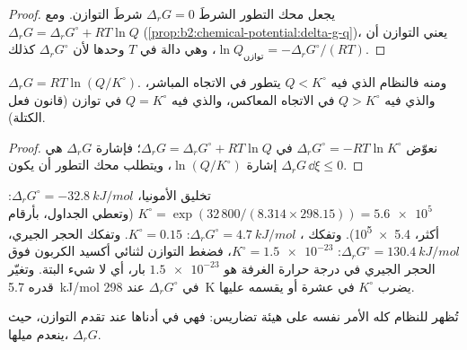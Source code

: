 \begin{proof}
يجعل محك التطور الشرطَ $\Delta_r G = 0$ شرطَ التوازن.
ومع $\Delta_r G = \Delta_r G^\circ + RT\ln Q$
(\cref{prop:b2:chemical-potential:delta-g-q})، يعني التوازن أن $\ln Q_{\text{توازن}}
= -\Delta_r G^\circ/(RT)$، وهي دالة في $T$ وحدها لأن $\Delta_r G^\circ$ كذلك.
\end{proof}

\begin{corollary}\label{cor:b2:equilibrium-shifts:mass-action}
$\Delta_r G = RT\ln(Q/K^\circ)$. ومنه فالنظام الذي فيه $Q < K^\circ$ يتطور
في الاتجاه المباشر، والذي فيه $Q > K^\circ$ في الاتجاه المعاكس، والذي فيه $Q = K^\circ$ في
توازن (قانون فعل الكتلة).
\end{corollary}

\begin{proof}
نعوّض $\Delta_r G^\circ = -RT\ln K^\circ$ في $\Delta_r G = \Delta_r G^\circ
+ RT\ln Q$؛ فإشارة $\Delta_r G$ هي إشارة $\ln(Q/K^\circ)$، ويتطلب
محك التطور أن يكون $\Delta_r G\,\dd\xi \leq 0$.
\end{proof}

\begin{example}\label{ex:b2:equilibrium-shifts:constants}
تخليق الأمونيا، $\Delta_r G^\circ = \qty{-32.8}{kJ/mol}$: $K^\circ =
\exp(32\,800/(8.314 \times 298.15)) = \num{5.6e5}$ (وتعطي الجداول، بأرقام
أكثر، \num{5.4e5}). وتفكك ، $\Delta_r G^\circ =
\qty{+4.7}{kJ/mol}$: $K^\circ = 0.15$. وتفكك الحجر الجيري،
$\Delta_r G^\circ = \qty{+130.4}{kJ/mol}$: $K^\circ = \num{1.5e-23}$، فضغط
التوازن لثنائي أكسيد الكربون فوق الحجر الجيري في درجة حرارة الغرفة
هو $\num{1.5e-23}$ بار، أي لا شيء البتة. وتغيّر قدره \qty{5.7}{kJ/mol} في
$\Delta_r G^\circ$ عند \qty{298}{K} يضرب $K^\circ$ في عشرة أو يقسمه عليها.
\end{example}

تُظهر  للنظام كله الأمر نفسه على هيئة تضاريس: فهي في أدناها عند
تقدم التوازن، حيث ينعدم ميلها، $\Delta_r G$.

